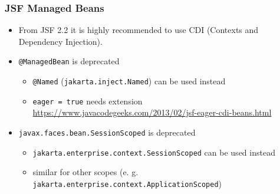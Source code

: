 \documentclass[10pt,xcolor=pdflatex]{beamer}
\begin{document}
\begin{frame}\frametitle{JSF Managed Beans}
	\begin{itemize}
      \item From JSF 2.2 it is highly recommended to use CDI (Contexts and Dependency Injection).
      \item \texttt{@ManagedBean} is deprecated
        \begin{itemize}
          \item \texttt{@Named} (\texttt{jakarta.inject.Named}) can be used instead
          \item \texttt{eager = true} needs extension \url{https://www.javacodegeeks.com/2013/02/jsf-eager-cdi-beans.html}
        \end{itemize}
      \item \texttt{javax.faces.bean.SessionScoped} is deprecated
        \begin{itemize}
          \item \texttt{jakarta.enterprise.context.SessionScoped} can be used instead
          \item similar for other scopes (e. g. \texttt{jakarta.enterprise.context.ApplicationScoped})
        \end{itemize}
	\end{itemize}
\end{frame}
\end{document}
